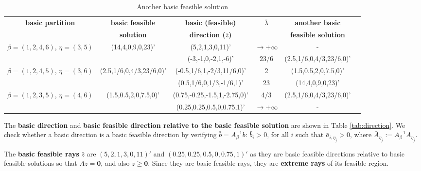 \begin{table}[!h]
\centering
\footnotesize
\begin{tabular}{|c|c|c|c|c|c|}\hline

\textbf{basic partition} & \textbf{basic feasible} & \textbf{basic (feasible)} & $\bar{\lambda}$ & \textbf{another basic} \\
&\textbf{solution} & \textbf{direction ($\bar{z}$)} & & \textbf{feasible solution} \\
\hline
$\beta = (1,2,4,6) $, $\eta = (3,5)$&(14,4,0,9,0,23)'&(5,2,1,3,0,11)'&$\to+\infty$&-\\
&&(-3,-1,0,-2,1,-6)'&23/6&(2.5,1/6,0,4/3,23/6,0)'\\\hline
$\beta = (1,2,4,5) $, $\eta = (3,6)$&(2.5,1/6,0,4/3,23/6,0)'&(-0.5,1/6,1,-2/3,11/6,0)'&2&(1.5,0.5,2,0,7.5,0)'\\
&&(0.5,1/6,0,1/3,-1/6,1)'&23&(14,4,0,9,0,23)'\\\hline
$\beta = (1,2,3,5) $, $\eta = (4,6)$&(1.5,0.5,2,0,7.5,0)'&(0.75,-0.25,-1.5,1,-2.75,0)'&4/3&(2.5,1/6,0,4/3,23/6,0)'\\
&&(0.25,0.25,0.5,0,0.75,1)'&$\to+\infty$&-\\\hline
\end{tabular}
\caption{Another basic feasible solution}
\label{tab:another-sol}
\end{table}

The \textbf{basic direction} and \textbf{basic feasible direction relative to the basic feasible solution} are shown in Table \ref{tab:direction}. We check whether a basic direction is a basic feasible direction by verifying  $\bar{b} = A_{\beta}^{-1}b$: $\bar{b}_i > 0$, for all $i$ such that $\bar{a}_{i,\eta_j}>0$, where $\bar{A}_{\eta_j} := A_{\beta}^{-1}A_{\eta_j}$. 

The \textbf{basic feasible rays} $\bar{z}$ are $(5,2,1,3,0,11)'$ and $(0.25,0.25,0.5,0,0.75,1)'$ as they are basic feasible directions relative to basic feasible solutions so that $A\bar{z} = \mathbf{0}$, and also $\bar{z} \geq \mathbf{0}$. Since they are basic feasible rays, they are \textbf{extreme rays} of its feasible region.